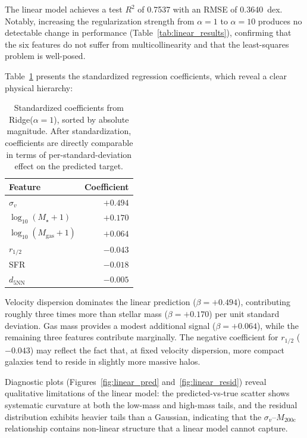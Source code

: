 \documentclass[12pt, a4paper]{article}
\newcommand{\Mhalo}{M_{200\mathrm{c}}}
\newcommand{\sigmav}{\sigma_v}
\newcommand{\Mstar}{M_\star}
\begin{document}
The linear model achieves a test $R^2$ of 0.7537 with an RMSE of 0.3640~dex.  Notably, increasing the regularization strength from $\alpha = 1$ to $\alpha = 10$ produces no detectable change in performance (Table~\ref{tab:linear_results}), confirming that the six features do not suffer from multicollinearity and that the least-squares problem is well-posed.

Table~\ref{tab:linear_coefficients} presents the standardized regression coefficients, which reveal a clear physical hierarchy:

\begin{table}[H]
  \centering
  \caption{Standardized coefficients from Ridge($\alpha = 1$), sorted by absolute magnitude.  After standardization, coefficients are directly comparable in terms of per-standard-deviation effect on the predicted target.}
  \label{tab:linear_coefficients}
  \begin{tabular}{@{}lr@{}}
    \toprule
    Feature & Coefficient \\
    \midrule
    $\sigmav$              & $+0.494$ \\
    $\log_{10}(\Mstar + 1)$ & $+0.170$ \\
    $\log_{10}(M_\mathrm{gas} + 1)$ & $+0.064$ \\
    $r_{1/2}$              & $-0.043$ \\
    SFR                    & $-0.018$ \\
    $d_{5\mathrm{NN}}$     & $-0.005$ \\
    \bottomrule
  \end{tabular}
\end{table}

Velocity dispersion dominates the linear prediction ($\beta = +0.494$), contributing roughly three times more than stellar mass ($\beta = +0.170$) per unit standard deviation.  Gas mass provides a modest additional signal ($\beta = +0.064$), while the remaining three features contribute marginally.  The negative coefficient for $r_{1/2}$ ($-0.043$) may reflect the fact that, at fixed velocity dispersion, more compact galaxies tend to reside in slightly more massive halos.

Diagnostic plots (Figures~\ref{fig:linear_pred} and~\ref{fig:linear_resid}) reveal qualitative limitations of the linear model: the predicted-vs-true scatter shows systematic curvature at both the low-mass and high-mass tails, and the residual distribution exhibits heavier tails than a Gaussian, indicating that the $\sigmav$--$\Mhalo$ relationship contains non-linear structure that a linear model cannot capture.
\end{document}
